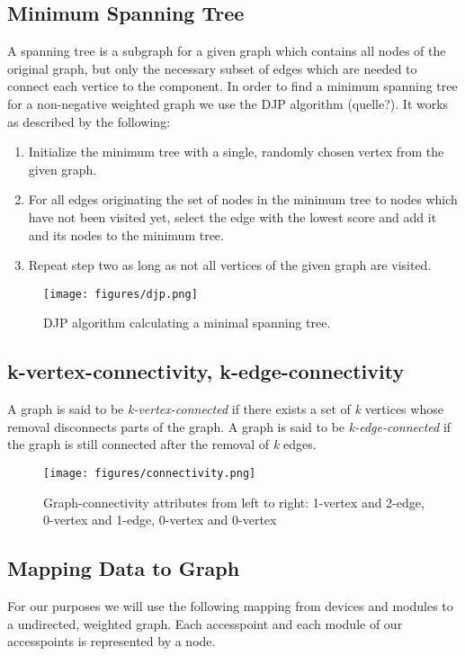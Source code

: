   \subsection{Minimum Spanning Tree}
    A spanning tree is a subgraph for a given graph which contains all nodes of the original graph, but only the necessary subset of edges which are needed to connect each vertice
    to the component. In order to find a minimum spanning tree for a non-negative weighted graph we use the DJP algorithm (quelle?).
    It works as described by the following:
    \begin{enumerate}
     \item Initialize the minimum tree with a single, randomly chosen vertex from the given graph.
     \item For all edges originating the set of nodes in the minimum tree to nodes which have not been visited yet, select the edge with the lowest score and add it and its nodes 
      to the minimum tree.
     \item Repeat step two as long as not all vertices of the given graph are visited.
    \end{enumerate}
    \begin{figure}[th!]
      \centering
      \texttt{[image: figures/djp.png]}
      \caption{DJP algorithm calculating a minimal spanning tree.}
      \label{fig:djp}
    \end{figure}
    
  \subsection{k-vertex-connectivity, k-edge-connectivity}
    A graph is said to be \textit{k-vertex-connected} if there exists a set of \textit{k} vertices whose removal disconnects parts of the graph.\newline
    A graph is said to be \textit{k-edge-connected} if the graph is still connected after the removal of \textit{k} edges.
    \begin{figure}[th!]
      \centering
      \texttt{[image: figures/connectivity.png]}
      \caption{Graph-connectivity attributes from left to right: 1-vertex and 2-edge, 0-vertex and 1-edge, 0-vertex and 0-vertex}
      \label{fig:connectivity}
    \end{figure}
    
  \subsection{Mapping Data to Graph}
    For our purposes we will use the following mapping from devices and modules to a undirected, weighted graph.
    Each accesspoint and each module of our accesspoints is represented by a node.
    
